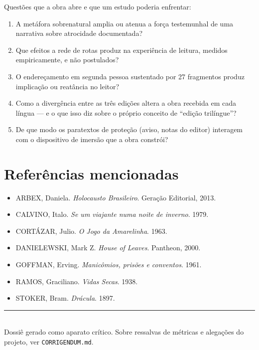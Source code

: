 \documentclass[11pt,a4paper]{article}
\begin{document}
Questões que a obra abre e que um estudo poderia enfrentar:

\begin{enumerate}
\item A metáfora sobrenatural amplia ou atenua a força testemunhal de uma
narrativa sobre atrocidade documentada?
\item Que efeitos a rede de rotas produz na experiência de leitura, medidos
empiricamente, e não postulados?
\item O endereçamento em segunda pessoa sustentado por 27 fragmentos produz
implicação ou reatância no leitor?
\item Como a divergência entre as três edições altera a obra recebida em cada
língua --- e o que isso diz sobre o próprio conceito de ``edição trilíngue''?
\item De que modo os paratextos de proteção (aviso, notas do editor)
interagem com o dispositivo de imersão que a obra constrói?
\end{enumerate}

\section*{Referências mencionadas}

\begin{itemize}\small
\item ARBEX, Daniela. \textit{Holocausto Brasileiro}. Geração Editorial, 2013.
\item CALVINO, Italo. \textit{Se um viajante numa noite de inverno}. 1979.
\item CORTÁZAR, Julio. \textit{O Jogo da Amarelinha}. 1963.
\item DANIELEWSKI, Mark Z. \textit{House of Leaves}. Pantheon, 2000.
\item GOFFMAN, Erving. \textit{Manicômios, prisões e conventos}. 1961.
\item RAMOS, Graciliano. \textit{Vidas Secas}. 1938.
\item STOKER, Bram. \textit{Drácula}. 1897.
\end{itemize}

\vfill
\noindent\rule{\linewidth}{0.4pt}\\
{\footnotesize Dossiê gerado como aparato crítico. Sobre ressalvas de métricas
e alegações do projeto, ver \texttt{CORRIGENDUM.md}.}
\end{document}
